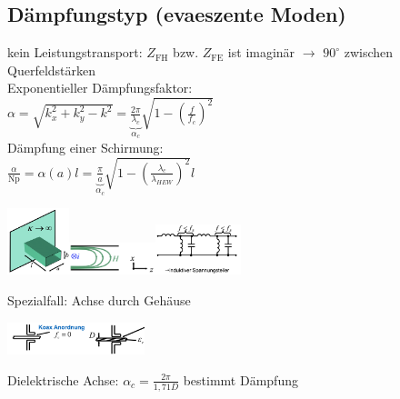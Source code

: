 \documentclass[english]{latex4ei/latex4ei_sheet}
\begin{document}
\begin{sectionbox}
	\subsection{Dämpfungstyp (evaeszente Moden)}
	kein Leistungstransport: $Z_{\text{FH}}$ bzw. $Z_{\text{FE}}$ ist imaginär $\rightarrow$ $90^\circ$ zwischen Querfeldstärken\\
	Exponentieller Dämpfungsfaktor:\\
	$\alpha=\sqrt{k_{x}^{2}+k_{y}^{2}-k^{2}}=\underbrace{\frac{2 \pi}{\lambda_{c}}}_{\alpha_{c}} \sqrt{1-\left(\frac{f}{f_{c}}\right)^{2}}$\\
	Dämpfung einer Schirmung:\\ 
	$\frac{\alpha}{\mathrm{Np}}=\alpha(a) l=\underbrace{\frac{\pi}{a}}_{\alpha_c} \sqrt{1-\left(\frac{\lambda_{c}}{\lambda_{H E W}}\right)^{2}} l$\\
	\begin{center}\includegraphics[width = 1.8cm]{./img/hl-schirmung.png}\includegraphics[width = 2.5cm]{./img/hl-schirmung3.png}\includegraphics[width = 2.5cm]{./img/hl-daempfung.png}\end{center}
	Spezialfall: Achse durch Gehäuse\\
	\begin{center}\includegraphics[width = 4cm]{./img/hl-schirmung2.jpeg}\end{center}
	Dielektrische Achse: $\alpha_{c}=\frac{2 \pi}{1,71 D}$ bestimmt Dämpfung\\
\end{sectionbox}
\end{document}
